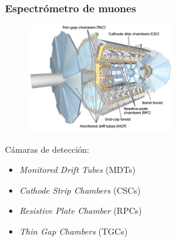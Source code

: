 \documentclass[10pt, compress,spanish]{beamer}
\begin{document}
\begin{frame}[fragile]
\frametitle{Espectrómetro de muones}

\normalsize


\begin{figure}
\centering
\includegraphics[width=0.55\textwidth]{muon-eps-converted-to.pdf}
\end{figure}

Cámaras de detección:
\begin{itemize}

  \item \textit{Monitored Drift Tubes} (MDTs)

  \item \textit{Cathode Strip Chambers} (CSCs)

  \item \textit{Resistive Plate Chamber} (RPCs)

  \item \textit{Thin Gap Chambers} (TGCs)

\end{itemize}


\end{frame}



\end{document}
